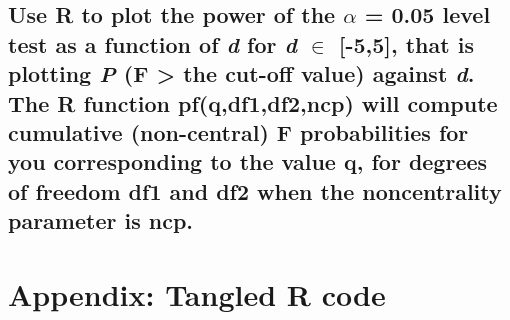 \documentclass[11pt]{article}
\begin{document}
\subsection{Use R to plot the power of the $\alpha$ = 0.05 level test as a function of \emph{d} for \emph{d} $\in$ [-5,5], that is plotting \emph{P} (F > the cut-off value) against \emph{d}. The R function pf(q,df1,df2,ncp) will compute cumulative (non-central) F probabilities for you corresponding to the value q, for degrees of freedom df1 and df2 when the noncentrality parameter is ncp.}
\label{sec-3-2}


\newpage
\section{Appendix: Tangled R code}
\label{sec-4}




\end{document}
